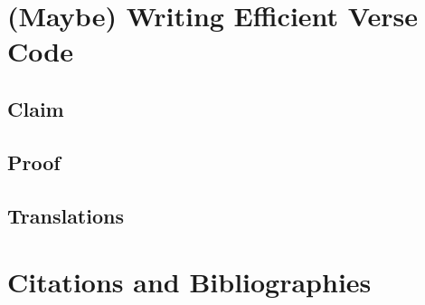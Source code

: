 \documentclass{article}
\begin{document}
\section{(Maybe) Writing Efficient Verse Code}

\subsection{Claim}
\subsection{Proof}
\subsection{Translations}


\section{Citations and Bibliographies}







\end{document}
